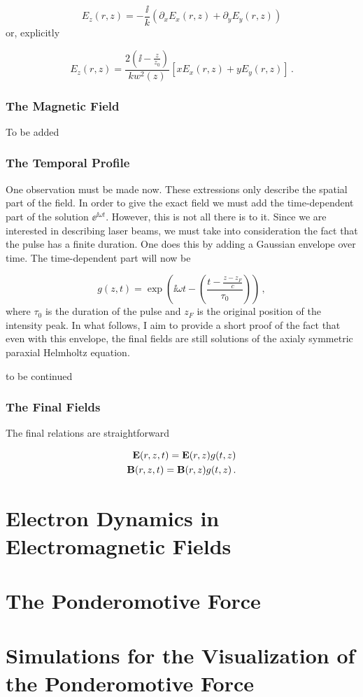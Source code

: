 \documentclass[12pt, class=report, crop=false]{standalone}
\begin{document}
\begin{equation}
  E_z (r,z) = - \frac{\ii}{k} \left( \partial_x E_x (r,z) +\partial_y E_y (r,z)\right)
\end{equation}
or, explicitly

\begin{equation}
  E_z (r,z) = \frac{2 \left(\ii -\frac{z}{z_0}\right)}{kw^2 (z)} [xE_x (r,z) +yE_y(r,z)]\,.
\end{equation}

\subsubsection{The Magnetic Field}
To be added

\subsubsection{The Temporal Profile}
One observation must be made now. These extressions only describe the spatial part of the field. In order to give the exact field we must add the time-dependent part of the solution \(\ee^{\ii \omega t}\). However, this is not all there is to it. Since we are interested in describing laser beams, we must take into consideration the fact that the pulse has a finite duration. One does this by adding a Gaussian envelope over time. The time-dependent part will now be

\begin{equation}
  g(z,t) = \exp(\ii \omega t - \left( \frac{t-\frac{z-z_F}{c}}{\tau_0}\right))\,,
\end{equation}
where \(\tau_0\) is the duration of the pulse and \(z_F\) is the original position of the intensity peak. In what follows, I aim to provide a short proof of the fact that even with this envelope, the final fields are still solutions of the axialy symmetric paraxial Helmholtz equation.

to be continued

\subsubsection{The Final Fields}

The final relations are straightforward

\begin{subequations}
  \begin{align}
    \vb{E}(r,z,t) = \vb{E}(r,z) g(t,z) \\
    \vb{B}(r,z,t) = \vb{B}(r,z) g(t,z)\,.
  \end{align}
\end{subequations}


\section{Electron Dynamics in Electromagnetic Fields}
\section{The Ponderomotive Force}
\section{Simulations for the Visualization of the Ponderomotive Force}
\end{document}
